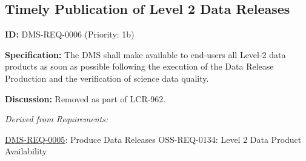 \documentclass[SE,toc,lsstdraft]{lsstdoc}
\begin{document}
\subsection{Timely Publication of Level 2 Data Releases}

\label{DMS-REQ-0006}
\textbf{ID:} DMS-REQ-0006 (Priority: 1b)

\textbf{Specification:} The DMS shall make available to end-users all Level-2 data products as soon as possible following the execution of the Data Release Production and the verification of science data quality.

\textbf{Discussion:}
Removed as part of LCR-962.

\emph{Derived from Requirements:}

\hyperref[DMS-REQ-0005]{DMS-REQ-0005}:
Produce Data Releases \newline
OSS-REQ-0134:
Level 2 Data Product Availability \newline


\end{document}
